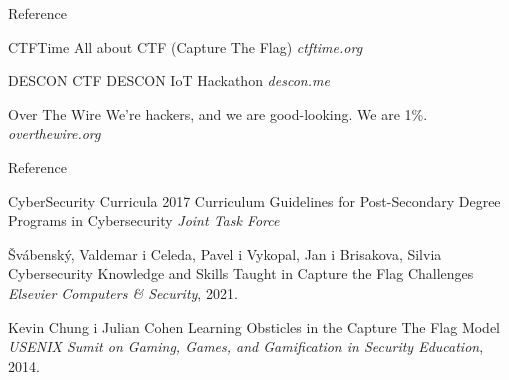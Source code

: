 \documentclass[aspectratio=169,xcolor=dvipsnames]{beamer}
\begin{document}
\begin{frame}{Reference}
    \footnotesize{
        \begin{thebibliography}{99}
             CTFTime
                \newblock All about CTF (Capture The Flag)
                \newblock \emph{ctftime.org}

             DESCON CTF
                \newblock DESCON IoT Hackathon
                \newblock \emph{descon.me}

             Over The Wire
                \newblock We're hackers, and we are good-looking. We are 1\%.
                \newblock \emph{overthewire.org}

        \end{thebibliography}
    }
\end{frame}


\begin{frame}{Reference}
    \footnotesize{
        \begin{thebibliography}{99}
             CyberSecurity Curricula 2017
                \newblock Curriculum Guidelines for Post-Secondary Degree
                Programs in Cybersecurity
                \newblock \emph{Joint Task Force}

             Švábenský, Valdemar i 
                Celeda, Pavel i Vykopal, Jan i Brisakova, Silvia
                \newblock Cybersecurity Knowledge and Skills Taught in 
                Capture the Flag Challenges
                \newblock \emph{Elsevier Computers \& Security}, 2021.

             Kevin Chung i Julian Cohen
                \newblock Learning Obsticles in the Capture The Flag Model
                \newblock \emph{USENIX Sumit on Gaming, Games, and 
                Gamification in Security Education}, 2014.

        \end{thebibliography}
    }
\end{frame}

\end{document}
